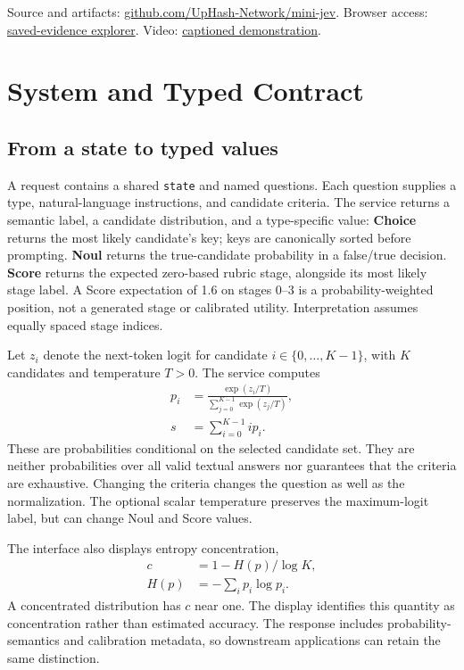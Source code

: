 \documentclass[11pt]{article}
\newcommand{\CodeURL}{\href{https://github.com/UpHash-Network/mini-jev/tree/research/naacl2027-demo}{github.com/UpHash-Network/mini-jev}}
\newcommand{\ExplorerURL}{\href{https://uphash-network.github.io/mini-jev/explorer/}{saved-evidence explorer}}
\newcommand{\DemoVideo}{\href{https://uphash-network.github.io/mini-jev/assets/LogitTrail_Demo_20261002.mp4}{captioned demonstration}}
\begin{document}
Source and artifacts: \CodeURL. Browser access: \ExplorerURL. Video: \DemoVideo.

\section{System and Typed Contract}
\label{sec:system}
\subsection{From a state to typed values}
A request contains a shared \texttt{state} and named questions. Each question supplies a type, natural-language instructions, and candidate criteria. The service returns a semantic label, a candidate distribution, and a type-specific value:
\textbf{Choice} returns the most likely candidate's key; keys are canonically sorted before prompting. \textbf{Noul} returns the true-candidate probability in a false/true decision. \textbf{Score} returns the expected zero-based rubric stage, alongside its most likely stage label.
A Score expectation of 1.6 on stages 0--3 is a probability-weighted position, not a generated stage or calibrated utility. Interpretation assumes equally spaced stage indices.

Let $z_i$ denote the next-token logit for candidate $i\in\{0,\ldots,K-1\}$, with $K$ candidates and temperature $T>0$. The service computes
\begin{equation}
\begin{aligned}
 p_i &= \frac{\exp(z_i/T)}{\sum_{j=0}^{K-1}\exp(z_j/T)},\\
 s &= \sum_{i=0}^{K-1} i p_i.
\end{aligned}
\end{equation}
These are probabilities conditional on the selected candidate set. They are neither probabilities over all valid textual answers nor guarantees that the criteria are exhaustive. Changing the criteria changes the question as well as the normalization. The optional scalar temperature preserves the maximum-logit label, but can change Noul and Score values.

The interface also displays entropy concentration,
\begin{equation}
\begin{aligned}
 c &= 1 - H(p)/\log K,\\
 H(p) &= -\sum_i p_i\log p_i.
\end{aligned}
\end{equation}
A concentrated distribution has $c$ near one. The display identifies this quantity as concentration rather than estimated accuracy. The response includes probability-semantics and calibration metadata, so downstream applications can retain the same distinction.
\end{document}
